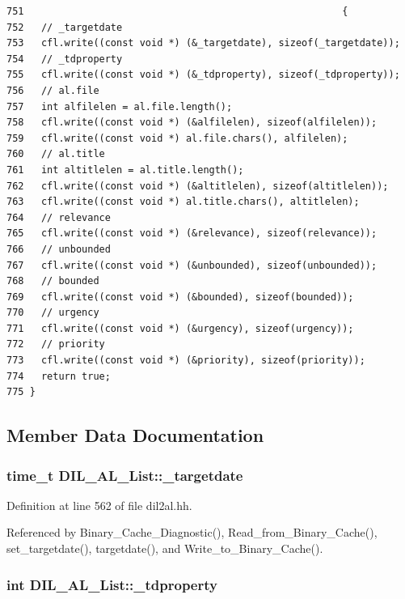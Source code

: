 \footnotesize\begin{verbatim}751                                                       {
752   // _targetdate
753   cfl.write((const void *) (&_targetdate), sizeof(_targetdate));
754   // _tdproperty
755   cfl.write((const void *) (&_tdproperty), sizeof(_tdproperty));
756   // al.file
757   int alfilelen = al.file.length();
758   cfl.write((const void *) (&alfilelen), sizeof(alfilelen));
759   cfl.write((const void *) al.file.chars(), alfilelen);
760   // al.title
761   int altitlelen = al.title.length();
762   cfl.write((const void *) (&altitlelen), sizeof(altitlelen));
763   cfl.write((const void *) al.title.chars(), altitlelen);
764   // relevance
765   cfl.write((const void *) (&relevance), sizeof(relevance));
766   // unbounded
767   cfl.write((const void *) (&unbounded), sizeof(unbounded));
768   // bounded
769   cfl.write((const void *) (&bounded), sizeof(bounded));
770   // urgency
771   cfl.write((const void *) (&urgency), sizeof(urgency));
772   // priority
773   cfl.write((const void *) (&priority), sizeof(priority));
774   return true;
775 }
\end{verbatim}\normalsize 


\subsection{Member Data Documentation}
\subsubsection{\setlength{\rightskip}{0pt plus 5cm}time\_\-t DIL\_\-AL\_\-List::\_\-targetdate\hspace{0.3cm}{\tt  [protected]}}\label{classDIL__AL__List_n2}




Definition at line 562 of file dil2al.hh.

Referenced by Binary\_\-Cache\_\-Diagnostic(), Read\_\-from\_\-Binary\_\-Cache(), set\_\-targetdate(), targetdate(), and Write\_\-to\_\-Binary\_\-Cache().
\subsubsection{\setlength{\rightskip}{0pt plus 5cm}int DIL\_\-AL\_\-List::\_\-tdproperty\hspace{0.3cm}{\tt  [protected]}}\label{classDIL__AL__List_n3}




